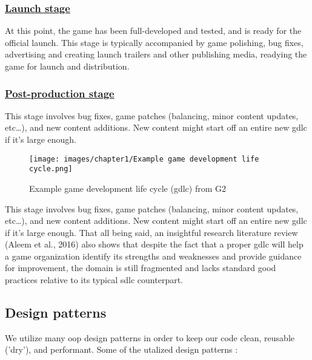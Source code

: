 \documentclass[../main.tex]{subfiles}
\begin{document}
\subsubsection*{\underline{Launch stage}}
At this point, the game has been full-developed and tested, and is ready for the official launch. This stage is typically accompanied by game polishing, bug fixes, advertising and creating launch trailers and other publishing media, readying the game for launch and distribution.

\subsubsection*{\underline{Post-production stage}}
This stage involves bug fixes, game patches (balancing, minor content updates, etc…), and new content additions. New content might start off an entire new \acrshort{gdlc} if it's large enough.



\begin{figure}[!ht]
\centering
\texttt{[image: images/chapter1/Example game development life cycle.png]}
\caption{Example game development life cycle (\acrshort{gdlc}) from G2}
\label{fig:Example game development life cycle (gdlc)}
\end{figure}
This stage involves bug fixes, game patches (balancing, minor content updates, etc…), and new content additions. New content might start off an entire new \acrshort{gdlc} if it's large enough.
That all being said, an insightful research literature review (Aleem et al., 2016) \cite{11} also shows that despite the fact that a proper \acrshort{gdlc} will help a game organization identify its strengths and weaknesses and provide guidance for improvement, the domain is still fragmented and lacks standard good practices relative to its typical \acrshort{sdlc} counterpart. 
\newpage

\subsection{Design patterns}
We utilize many \acrshort{oop} design patterns in order to keep our code clean, reusable ('dry'), and performant. Some of the utalized design patterns \cite{32}:
\end{document}

